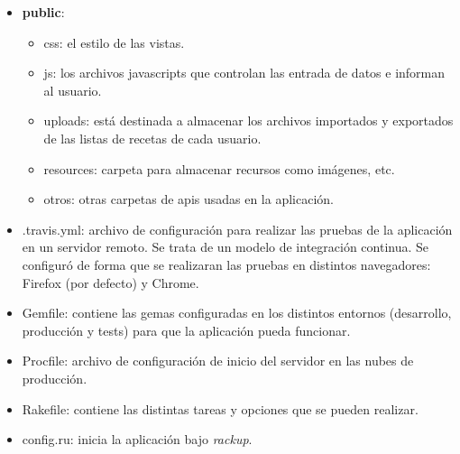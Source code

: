 \begin{itemize}
\begin{itemize}
		\end{itemize}
	\item \textbf{public}:
		\begin{itemize}
			\item css: el estilo de las vistas.
			\item js: los archivos javascripts que controlan las entrada de datos e informan al usuario.
			\item uploads: está destinada a almacenar los archivos importados y exportados de las listas de recetas de cada usuario.
			\item resources: carpeta para almacenar recursos como imágenes, etc.
			\item otros: otras carpetas de apis usadas en la aplicación.
		\end{itemize}
	\item .travis.yml: archivo de configuración para realizar las pruebas de la aplicación en un servidor remoto. Se trata de un modelo de integración continua. Se configuró de forma que se realizaran las pruebas en distintos navegadores: Firefox (por defecto) y Chrome.
	\item Gemfile: contiene las gemas configuradas en los distintos entornos (desarrollo, producción y tests) para que la aplicación pueda funcionar.
	\item Procfile: archivo de configuración de inicio del servidor en las nubes de producción.
	\item Rakefile: contiene las distintas tareas y opciones que se pueden realizar. 
	\item config.ru: inicia la aplicación bajo \emph{rackup}.
\end{itemize}
